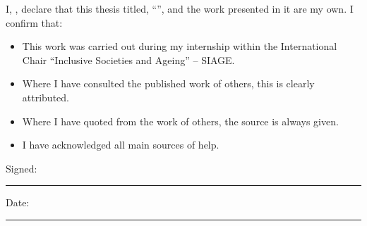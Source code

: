 \documentclass[
11pt,
english,
singlespacing,
headsepline,
]{MastersDoctoralThesis}
\begin{document}

\begin{declaration}
\addchaptertocentry{\authorshipname}
\noindent I, \authorname, declare that this thesis titled, \enquote{\ttitle}, and the work presented in it are my own. I confirm that:

\begin{itemize} 
\item This work was carried out during my internship within the International Chair ``Inclusive Societies and Ageing'' -- SIAGE.
\item Where I have consulted the published work of others, this is clearly attributed.
\item Where I have quoted from the work of others, the source is always given.
\item I have acknowledged all main sources of help.
\end{itemize}
 
\noindent Signed:\\
\rule[0.5em]{25em}{0.5pt}
 
\noindent Date:\\
\rule[0.5em]{25em}{0.5pt}
\end{declaration}

\cleardoublepage

\end{document}
